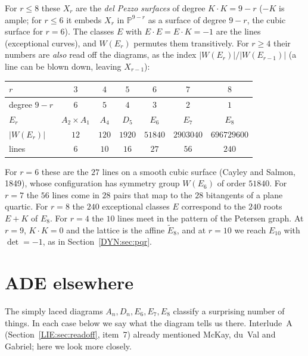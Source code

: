 \documentclass[11pt,openany]{book}
\theoremstyle{plain}
\theoremstyle{definition}
\theoremstyle{remark}
\newcommand{\abs}[1]{\left\lvert #1 \right\rvert}
\begin{document}
For $r\le8$ these $X_r$ are the \emph{del Pezzo surfaces} of degree $K\cdot K=9-r$ ($-K$ is ample; for
$r\le6$ it embeds $X_r$ in $\mathbb P^{9-r}$ as a surface of degree $9-r$, the cubic surface for $r=6$). The classes $E$ with $E\cdot E=E\cdot K=-1$ are the lines (exceptional curves), and $W(E_r)$
permutes them transitively. For $r\ge4$ their numbers are \emph{also} read off the diagrams, as the index
$\abs{W(E_r)}/\abs{W(E_{r-1})}$ (a line can be blown down, leaving $X_{r-1}$):
\begin{center}
\renewcommand{\arraystretch}{1.15}
\begin{tabular}{lcccccc}
\toprule
$r$ & $3$ & $4$ & $5$ & $6$ & $7$ & $8$\\
\midrule
degree $9-r$ & $6$ & $5$ & $4$ & $3$ & $2$ & $1$\\
$E_r$ & $A_2\times A_1$ & $A_4$ & $D_5$ & $E_6$ & $E_7$ & $E_8$\\
$\abs{W(E_r)}$ & $12$ & $120$ & $1920$ & $51840$ & $2903040$ & $696729600$\\
lines & $6$ & $10$ & $16$ & $27$ & $56$ & $240$\\
\bottomrule
\end{tabular}
\end{center}
For $r=6$ these are the $27$ lines on a smooth cubic surface (Cayley and Salmon, 1849), whose
configuration has symmetry group $W(E_6)$ of order $51840$. For $r=7$ the $56$ lines come in $28$ pairs that
map to the $28$ bitangents of a plane quartic. For $r=8$ the $240$ exceptional classes $E$ correspond to the
$240$ roots $E+K$ of $E_8$. For $r=4$ the $10$ lines meet in the pattern of the Petersen graph. At $r=9$,
$K\cdot K=0$ and the lattice is the affine $\tilde E_8$, and at $r=10$ we reach $E_{10}$ with $\det=-1$, as in
Section~\ref{DYN:sec:pqr}.

\section{ADE elsewhere}
\label{DYN:sec:elsewhere}

The simply laced diagrams $A_n,D_n,E_6,E_7,E_8$ classify a surprising number of things. In each case
below we say what the diagram tells us there. Interlude~A (Section~\ref{LIE:sec:readoff}, item~7) already
mentioned McKay, du~Val and Gabriel; here we look more closely.
\end{document}
